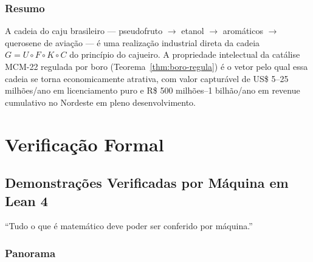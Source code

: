 \documentclass[12pt,a4paper,twoside]{book}
\theoremstyle{plain}
\theoremstyle{definition}
\theoremstyle{definition}
\begin{document}
\section{Resumo}

A cadeia do caju brasileiro --- pseudofruto $\to$ etanol $\to$ aromáticos
$\to$ querosene de aviação --- é uma realização industrial direta da
cadeia $G = U \circ F \circ K \circ C$ do princípio do cajueiro. A
propriedade intelectual da catálise MCM-22 regulada por boro
(Teorema~\ref{thm:boro-regula}) é o vetor pelo qual essa cadeia se
torna economicamente atrativa, com valor capturável de
US\$ 5--25 milhões/ano em licenciamento puro e
R\$ 500 milhões--1 bilhão/ano em revenue cumulativo no Nordeste em
pleno desenvolvimento.

\part{Verificação Formal}

\chapter{Demonstrações Verificadas por Máquina em Lean 4}
\label{cap:lean}

\epigraph{``Tudo o que é matemático deve poder ser conferido por máquina.''}{}

\section{Panorama}
\end{document}
